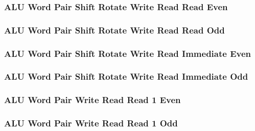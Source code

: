 \subsubsection[{\small ALU Word Pair Shift Rotate Write Read Read Even}]{ALU Word Pair Shift Rotate Write Read Read Even} \label{sec:format-ALU-WPSWRRE}



\subsubsection[{\small ALU Word Pair Shift Rotate Write Read Read Odd}]{ALU Word Pair Shift Rotate Write Read Read Odd} \label{sec:format-ALU-WPSWRRO}



\subsubsection[{\small ALU Word Pair Shift Rotate Write Read Immediate Even}]{ALU Word Pair Shift Rotate Write Read Immediate Even} \label{sec:format-ALU-WPSWRIE}



\subsubsection[{\small ALU Word Pair Shift Rotate Write Read Immediate Odd}]{ALU Word Pair Shift Rotate Write Read Immediate Odd} \label{sec:format-ALU-WPSWRIO}



\subsubsection[{\small ALU Word Pair Write Read Read 1 Even}]{ALU Word Pair Write Read Read 1 Even} \label{sec:format-ALU-WPWRR1E}



\subsubsection[{\small ALU Word Pair Write Read Read 1 Odd}]{ALU Word Pair Write Read Read 1 Odd} \label{sec:format-ALU-WPWRR1O}

